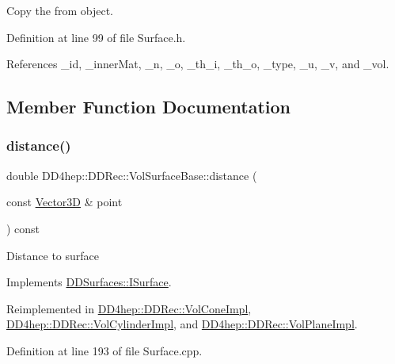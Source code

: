 Copy the from object. 



Definition at line 99 of file Surface.\+h.



References \+\_\+id, \+\_\+inner\+Mat, \+\_\+n, \+\_\+o, \+\_\+th\+\_\+i, \+\_\+th\+\_\+o, \+\_\+type, \+\_\+u, \+\_\+v, and \+\_\+vol.



\subsection{Member Function Documentation}
\hypertarget{class_d_d4hep_1_1_d_d_rec_1_1_vol_surface_base_aefb278e0429219871c47b602a2593fef}{}\label{class_d_d4hep_1_1_d_d_rec_1_1_vol_surface_base_aefb278e0429219871c47b602a2593fef} 
\subsubsection{\texorpdfstring{distance()}{distance()}}
{\footnotesize\ttfamily double D\+D4hep\+::\+D\+D\+Rec\+::\+Vol\+Surface\+Base\+::distance (\begin{DoxyParamCaption}\item[{const \hyperlink{class_d_d_surfaces_1_1_vector3_d}{Vector3D} \&}]{point }\end{DoxyParamCaption}) const\hspace{0.3cm}{\ttfamily [virtual]}}

Distance to surface 

Implements \hyperlink{class_d_d_surfaces_1_1_i_surface_a430ebd157354388b50218dfb356a9ca1}{D\+D\+Surfaces\+::\+I\+Surface}.



Reimplemented in \hyperlink{class_d_d4hep_1_1_d_d_rec_1_1_vol_cone_impl_af24505f927a05c9d8225609135257f1c}{D\+D4hep\+::\+D\+D\+Rec\+::\+Vol\+Cone\+Impl}, \hyperlink{class_d_d4hep_1_1_d_d_rec_1_1_vol_cylinder_impl_a34013e2fc45f1312dea83210f9c30751}{D\+D4hep\+::\+D\+D\+Rec\+::\+Vol\+Cylinder\+Impl}, and \hyperlink{class_d_d4hep_1_1_d_d_rec_1_1_vol_plane_impl_a5c94e22dfc7011f6ebcf40bae215bf31}{D\+D4hep\+::\+D\+D\+Rec\+::\+Vol\+Plane\+Impl}.



Definition at line 193 of file Surface.\+cpp.




